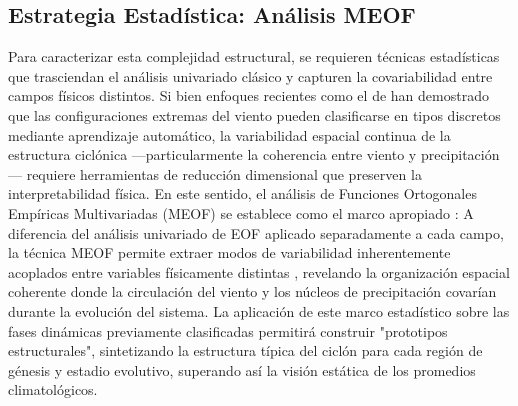 \subsection{Estrategia Estadística: Análisis MEOF}\label{subsec:intro_meof}
Para caracterizar esta complejidad estructural, se requieren técnicas estadísticas que trasciendan el análisis univariado clásico y capturen la covariabilidad entre campos físicos distintos. Si bien enfoques recientes como el de \citet{eisenstein2023identification} han demostrado que las configuraciones extremas del viento pueden clasificarse en tipos discretos mediante aprendizaje automático, la variabilidad espacial continua de la estructura ciclónica ---particularmente la coherencia entre viento y precipitación--- requiere herramientas de reducción dimensional que preserven la interpretabilidad física. En este sentido, el análisis de Funciones Ortogonales Empíricas Multivariadas (MEOF) se establece como el marco apropiado \citep{hannachi2007empirical}: A diferencia del análisis univariado de EOF aplicado separadamente a cada campo, la técnica MEOF permite extraer modos de variabilidad inherentemente acoplados entre variables físicamente distintas \citep{liang2018multivariate}, revelando la organización espacial coherente donde la circulación del viento y los núcleos de precipitación covarían durante la evolución del sistema.
%
%
La aplicación de este marco estadístico sobre las fases dinámicas previamente clasificadas permitirá construir "prototipos estructurales", sintetizando la estructura típica del ciclón para cada región de génesis y estadio evolutivo, superando así la visión estática de los promedios climatológicos.

